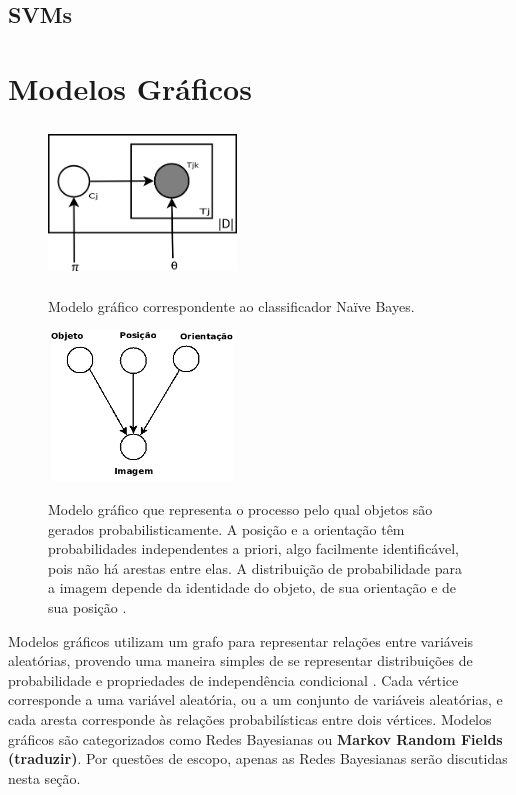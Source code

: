 \subsection{SVMs}
\label{subsection:SVMs}

\section{Modelos Gráficos}

\begin{figure}[t]
  \centering %
  \includegraphics[width=5cm, height=4cm]{graphical-naive.png}\\
  \caption{Modelo gráfico correspondente ao classificador Naïve Bayes.}
  \label{fig:graphical-naive}
\end{figure}

\begin{figure}[t]
  \centering %
  \includegraphics[width=5cm, height=4cm]{generative-bishop.png}\\
  \caption{Modelo gráfico que representa o processo pelo qual objetos são gerados probabilisticamente. A posição e a orientação têm probabilidades independentes a priori, algo facilmente identificável, pois não há arestas entre elas. A distribuição de probabilidade para a imagem depende da identidade do objeto, de sua orientação e de sua posição \cite{bishop}.}
  \label{fig:generative-bishop}
\end{figure}

Modelos gráficos utilizam um grafo para representar relações entre variáveis aleatórias, provendo uma maneira simples de se representar distribuições de probabilidade e propriedades de independência condicional \cite{bishop}. Cada vértice corresponde a uma variável aleatória, ou a um conjunto de variáveis aleatórias, e cada aresta corresponde às relações probabilísticas entre dois vértices. Modelos gráficos são categorizados como Redes Bayesianas ou \textbf{Markov Random Fields (traduzir)}. Por questões de escopo, apenas as Redes Bayesianas serão discutidas nesta seção.

